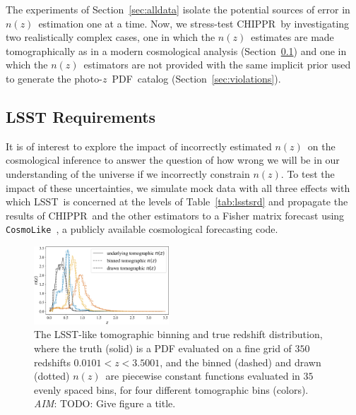 \documentclass[iop]{emulateapj}
\newcommand{\todo}[3]{{\color{#2}\emph{#1}: #3}}
\newcommand{\aim}[1]{\todo{AIM}{red}{#1}}
\newcommand{\Sect}[1]{Section~\ref{#1}}
\newcommand{\project}[1]{\textsc{#1}}
\newcommand{\lsst}{\project{LSST}}
\newcommand{\Chippr}{\project{CHIPPR}}%
\newcommand{\repo}[1]{\texttt{#1}}
\newcommand{\cosmolike}{\repo{CosmoLike}}
\newcommand{\pz}{photo-$z$}
\newcommand{\pzpdf}{\pz\ PDF}%
\newcommand{\nz}{$n(z)$}
\begin{document}
The experiments of \Sect{sec:alldata} isolate the potential sources of error in \nz\ estimation one at a time.
Now, we stress-test \Chippr\ by investigating two realistically complex cases, one in which the \nz\ estimates are made tomographically as in a modern cosmological analysis (\Sect{sec:lsstdemo}) and one in which the \nz\ estimators are not provided with the same implicit prior used to generate the \pzpdf\ catalog (\Sect{sec:violations}).

\subsection{LSST Requirements}
\label{sec:lsstdemo}

It is of interest to explore the impact of incorrectly estimated \nz\ on the cosmological inference to answer the question of how wrong we will be in our understanding of the universe if we incorrectly constrain \nz.
To test the impact of these uncertainties, we simulate mock data with all three effects with which \lsst\ is concerned at the levels of Table~\ref{tab:lsstsrd} and propagate the results of \Chippr\ and the other estimators to a Fisher matrix forecast using \cosmolike\ \citep{krause_cosmolike_2017}, a publicly available cosmological forecasting code.

\begin{figure}
	\begin{center}
		\includegraphics[width=0.45\textwidth]{figures/chippr/cosmolike_inputs.png}
		\caption{
			The \lsst-like tomographic binning and true redshift distribution, where the truth (solid) is a PDF evaluated on a fine grid of $350$ redshifts $0.0101 < z < 3.5001$, and the binned (dashed) and drawn (dotted) \nz\ are piecewise constant functions evaluated in $35$ evenly spaced bins, for four different tomographic bins (colors).
			\aim{TODO: Give figure a title.}
		}
		\label{fig:tomobins}
	\end{center}
\end{figure}
\end{document}
